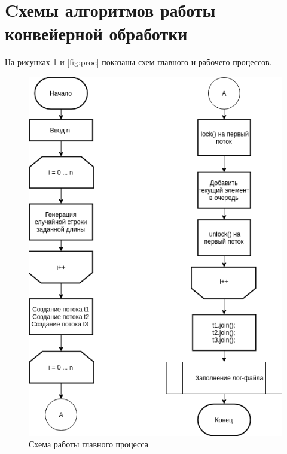 \documentclass[12pt]{report}
\begin{document}
\section{Cхемы алгоритмов работы конвейерной обработки}
На рисунках \ref{fig:main} и \ref{fig:proc} показаны схем главного и рабочего процессов.

\begin{figure}[h]
	\centering
	\includegraphics[width=0.6\linewidth]{main_fl.png}
	\caption{Схема работы главного процесса}
	\label{fig:main}
\end{figure}

\newpage
\end{document}
